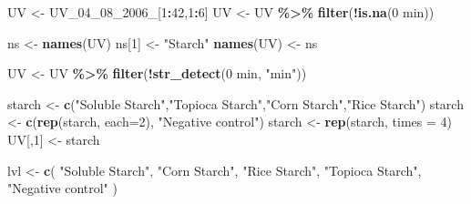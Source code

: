 \documentclass[
  12pt,
]{article}
\newenvironment{Shaded}{\begin{snugshade}}{\end{snugshade}}
\newcommand{\AttributeTok}[1]{\textcolor[rgb]{0.13,0.29,0.53}{#1}}
\newcommand{\DecValTok}[1]{\textcolor[rgb]{0.00,0.00,0.81}{#1}}
\newcommand{\FunctionTok}[1]{\textcolor[rgb]{0.13,0.29,0.53}{\textbf{#1}}}
\newcommand{\NormalTok}[1]{#1}
\newcommand{\OtherTok}[1]{\textcolor[rgb]{0.56,0.35,0.01}{#1}}
\newcommand{\SpecialCharTok}[1]{\textcolor[rgb]{0.81,0.36,0.00}{\textbf{#1}}}
\newcommand{\StringTok}[1]{\textcolor[rgb]{0.31,0.60,0.02}{#1}}
\begin{document}
\begin{Shaded}
\begin{Highlighting}[]
\NormalTok{UV }\OtherTok{\textless{}{-}}\NormalTok{ UV\_04\_08\_2006\_[}\DecValTok{1}\SpecialCharTok{:}\DecValTok{42}\NormalTok{,}\DecValTok{1}\SpecialCharTok{:}\DecValTok{6}\NormalTok{]}
\NormalTok{UV }\OtherTok{\textless{}{-}}\NormalTok{ UV }\SpecialCharTok{\%\textgreater{}\%} \FunctionTok{filter}\NormalTok{(}\SpecialCharTok{!}\FunctionTok{is.na}\NormalTok{(}\StringTok{\textasciigrave{}}\AttributeTok{0 min}\StringTok{\textasciigrave{}}\NormalTok{))}

\NormalTok{ns }\OtherTok{\textless{}{-}} \FunctionTok{names}\NormalTok{(UV)}
\NormalTok{ns[}\DecValTok{1}\NormalTok{] }\OtherTok{\textless{}{-}} \StringTok{"Starch"}
\FunctionTok{names}\NormalTok{(UV) }\OtherTok{\textless{}{-}}\NormalTok{ ns}

\NormalTok{UV }\OtherTok{\textless{}{-}}\NormalTok{ UV }\SpecialCharTok{\%\textgreater{}\%} \FunctionTok{filter}\NormalTok{(}\SpecialCharTok{!}\FunctionTok{str\_detect}\NormalTok{(}\StringTok{\textasciigrave{}}\AttributeTok{0 min}\StringTok{\textasciigrave{}}\NormalTok{, }\StringTok{"min"}\NormalTok{))}

\NormalTok{starch }\OtherTok{\textless{}{-}} \FunctionTok{c}\NormalTok{(}\StringTok{"Soluble Starch"}\NormalTok{,}\StringTok{"Topioca Starch"}\NormalTok{,}\StringTok{"Corn Starch"}\NormalTok{,}\StringTok{"Rice Starch"}\NormalTok{)}
\NormalTok{starch }\OtherTok{\textless{}{-}} \FunctionTok{c}\NormalTok{(}\FunctionTok{rep}\NormalTok{(starch, }\AttributeTok{each=}\DecValTok{2}\NormalTok{), }\StringTok{"Negative control"}\NormalTok{)}
\NormalTok{starch }\OtherTok{\textless{}{-}} \FunctionTok{rep}\NormalTok{(starch, }\AttributeTok{times =} \DecValTok{4}\NormalTok{)}
\NormalTok{UV[,}\DecValTok{1}\NormalTok{] }\OtherTok{\textless{}{-}}\NormalTok{ starch}

\NormalTok{lvl }\OtherTok{\textless{}{-}} \FunctionTok{c}\NormalTok{(}
  \StringTok{"Soluble Starch"}\NormalTok{,}
  \StringTok{"Corn Starch"}\NormalTok{,}
  \StringTok{"Rice Starch"}\NormalTok{,}
  \StringTok{"Topioca Starch"}\NormalTok{,}
  \StringTok{"Negative control"}
\NormalTok{)}


\end{Highlighting}
\end{Shaded}
\end{document}
